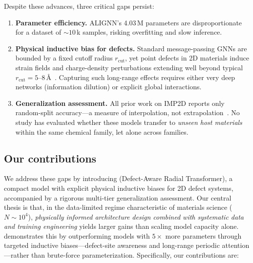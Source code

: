 Despite these advances, three critical gaps persist:
\begin{enumerate}
  \item \textbf{Parameter efficiency.}
    ALIGNN's 4.03\,M parameters are disproportionate for a dataset of
    ${\sim}10$\,k samples, risking overfitting and slow inference.
  \item \textbf{Physical inductive bias for defects.}
    Standard message-passing GNNs are bounded by a fixed cutoff radius
    $r_\mathrm{cut}$, yet point defects in 2D materials induce strain fields
    and charge-density perturbations extending well beyond typical
    $r_\mathrm{cut} = 5$--$8$\,\AA{}~\cite{fang2025}.
    Capturing such long-range effects requires either very deep networks
    (information dilution) or explicit global interactions.
  \item \textbf{Generalization assessment.}
    All prior work on IMP2D reports only random-split accuracy---a measure
    of interpolation, not extrapolation~\cite{li2025ood}.
    No study has evaluated whether these models transfer to \emph{unseen
    host materials} within the same chemical family, let alone across
    families.
\end{enumerate}

\subsection{Our contributions}

We address these gaps by introducing \dart{} (Defect-Aware Radial
Transformer), a compact model with explicit physical inductive biases for 2D
defect systems, accompanied by a rigorous multi-tier generalization
assessment.
%
Our central thesis is that, in the data-limited regime characteristic of
materials science ($N \sim 10^4$), \emph{physically informed architecture
design combined with systematic data and training engineering} yields
larger gains than scaling model capacity alone.
\dart{} demonstrates this by outperforming models with $5\times$ more
parameters through targeted inductive biases---defect-site awareness and
long-range periodic attention---rather than brute-force parameterization.
%
Specifically, our contributions are:

